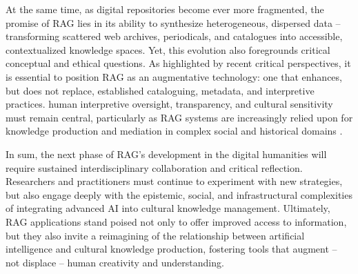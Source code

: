 \begin{spacing}{1.5}
At the same time, as digital repositories become ever more fragmented, the promise of RAG lies in its ability to synthesize heterogeneous, dispersed data -- transforming scattered web archives, periodicals, and catalogues into accessible, contextualized knowledge spaces. Yet, this evolution also foregrounds critical conceptual and ethical questions. As highlighted by recent critical perspectives, it is essential to position RAG as an augmentative technology: one that enhances, but does not replace, established cataloguing, metadata, and interpretive practices. human interpretive oversight, transparency, and cultural sensitivity must remain central, particularly as RAG systems are increasingly relied upon for knowledge production and mediation in complex social and historical domains \citep{di_marcantonio_intelligenza_2024}.

In sum, the next phase of RAG’s development in the digital humanities will require sustained interdisciplinary collaboration and critical reflection. Researchers and practitioners must continue to experiment with new strategies, but also engage deeply with the epistemic, social, and infrastructural complexities of integrating advanced AI into cultural knowledge management. Ultimately, RAG applications stand poised not only to offer improved access to information, but they also invite a reimagining of the relationship between artificial intelligence and cultural knowledge production, fostering tools that augment – not displace – human creativity and understanding.
\end{spacing}